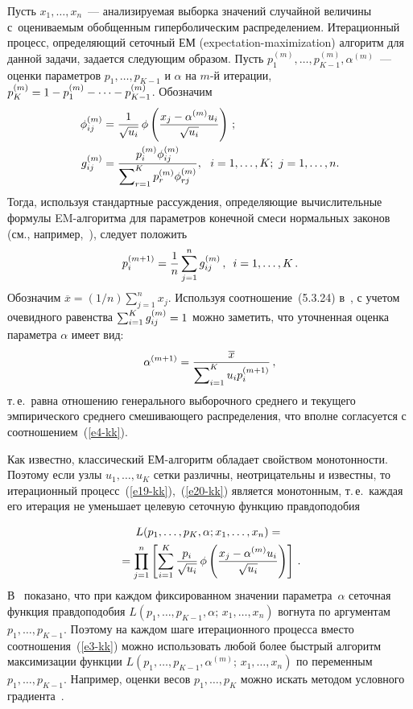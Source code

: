 \begin{multicols}{2}
Пусть
$x_1,\ldots,x_n$~--- анализируемая выборка значений случайной
величины с~оценива\-емым обобщенным гиперболическим распределением.
Итерационный процесс, определяющий сеточный ЕМ (expectation-maximization) ал\-го\-ритм для данной
задачи, задается следующим образом. Пусть
$p_1^{(m)},\ldots,p_{K-1}^{(m)}, \alpha^{(m)}$~--- оценки параметров
$p_1,\ldots,p_{K-1}$ и $\alpha$ на $m$-й итерации,
$p_K^{(m)}\hm=1-p_1^{(m)}-\cdots-p_{K-1}^{(m)}$. Обозначим
\begin{align*}
\phi_{ij}^{(m)}&=\displaystyle\frac{\displaystyle 1\mathstrut}{\displaystyle \sqrt{u_i}\mathstrut}\,\phi\left(\displaystyle\frac{\displaystyle x_j-\alpha^{(m)}u_i\mathstrut}{\displaystyle \sqrt{u_i}\mathstrut}\right)\,;\\
g_{ij}^{(m)}&=\displaystyle\frac{\displaystyle p_i^{(m)}\phi_{ij}^{(m)}\mathstrut}{\displaystyle \sum\nolimits_{r=1}^Kp_r^{(m)}\phi_{rj}^{(m)}\mathstrut},\
\  i=1,\ldots,K;\ j=1,\ldots,n.
\end{align*}
Тогда, используя стандартные рассуждения, определяющие
вычислительные формулы EM-ал\-го\-рит\-ма для параметров конечной смеси
нормальных законов (см., например,~\cite[разд.~5.3.7--5.3.8]{Korolev2011-2}), 
следует положить
\begin{equation}
p_i^{(m+1)}=\displaystyle\frac{\displaystyle 1\mathstrut}{\displaystyle n\mathstrut}\sum\limits_{j=1}^ng_{ij}^{(m)}\,, \enskip
i=1,\ldots,K\,.\label{e19-kk}
\end{equation}
Обозначим $\overline{x}=(1/n)\sum\nolimits_{j=1}^nx_j$. Используя
соотношение~(5.3.24) в~\cite{Korolev2011-2}, с учетом очевидного
равенства $\sum\nolimits_{i=1}^Kg_{ij}^{(m)}\hm=1$ можно заметить, что
уточненная оценка параметра $\alpha$ имеет вид:
\begin{equation}
\alpha^{(m+1)}=\displaystyle\frac{\displaystyle \overline{x}\mathstrut}{\displaystyle \sum\nolimits_{i=1}^Ku_ip_i^{(m+1)}\mathstrut}\,,
\label{e20-kk}
\end{equation}
т.\,е.\ равна отношению генерального выборочного среднего и текущего
эмпирического среднего смешивающего распределения, что вполне
согласуется с соотношением~(\ref{e4-kk}).

Как известно, классический ЕМ-ал\-го\-ритм обладает свойством
монотонности. Поэтому если узлы $u_1,\ldots,u_K$ сетки различны,
неотрицательны и известны, то итерационный процесс~(\ref{e19-kk}),~(\ref{e20-kk})
является монотонным, т.\,е.\ каждая его итерация не уменьшает
целевую сеточную функцию правдоподобия

\noindent
\begin{multline*}
L(p_1,\ldots,p_K,\alpha;x_1,\ldots,x_n)={}\\
{}=
\prod\limits_{j=1}^n\left[\sum\limits_{i=1}^K
\displaystyle\frac{\displaystyle p_i\mathstrut}{\displaystyle \sqrt{u_i}\mathstrut}\,\phi\left(\displaystyle\frac{\displaystyle x_j-\alpha^{(m)}u_i\mathstrut}{\displaystyle \sqrt{u_i}\mathstrut}\right)\right]\,.
\end{multline*}
В~\cite[разд.~5.7.4]{Korolev2011-2} показано, что при каждом
фиксированном значении параметра~$\alpha$ сеточная функция
правдоподобия $L(p_1,\ldots,p_{K-1},\alpha;\,x_1,\ldots,x_n)$
вогнута по аргументам $p_1,\ldots,p_{K-1}$. Поэтому на каждом шаге
итерационного процесса вмес\-то соотношения~(\ref{e3-kk}) можно использовать
любой более быстрый алгоритм максимизации функции
$L(p_1,\ldots,p_{K-1},\alpha^{(m)};\,x_1,\ldots,x_n)$ по переменным
$p_1,\ldots,p_{K-1}$. Например, оценки весов $p_1,\ldots,p_K$ можно
искать методом условного градиента~\cite{Korolev2011-2, kn2010}.


\end{multicols}
